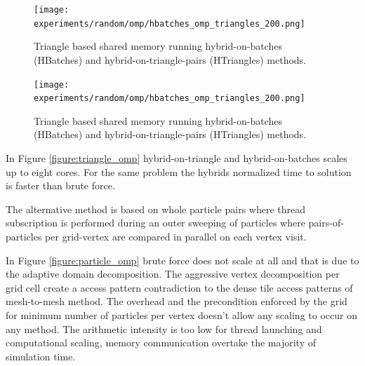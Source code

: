 \begin{figure}[htb]
  \begin{center}
    \texttt{[image: experiments/random/omp/hbatches\_omp\_triangles\_200.png]}
  \end{center}
  \caption{Triangle based shared memory running hybrid-on-batches (HBatches) and hybrid-on-triangle-pairs (HTriangles) methods.}
  \label{figure:hbatches_triangle_omp}
\end{figure}

\begin{figure}[htb]
  \begin{center}
    \texttt{[image: experiments/random/omp/hbatches\_omp\_triangles\_200.png]}
  \end{center}
  \caption{Triangle based shared memory running hybrid-on-batches (HBatches) and hybrid-on-triangle-pairs (HTriangles) methods.}
  \label{figure:htriangles_triangle_omp}
\end{figure}


In Figure \ref{figure:triangle_omp} hybrid-on-triangle and hybrid-on-batches scales up to eight cores. For the same problem the hybrids normalized time to solution is faster than brute force. 





The alternative method is based on whole particle pairs where thread subscription is performed during an outer sweeping of particles where pairs-of-particles per grid-vertex are compared in parallel on each vertex visit. 

In Figure \ref{figure:particle_omp} brute force does not scale at all and that is due to the adaptive domain decomposition. The aggressive vertex decomposition per grid cell create a access pattern contradiction to the dense tile access patterns of mesh-to-mesh method. The overhead and the precondition enforced by the grid for minimum number of particles per vertex doesn't allow any scaling to occur on any method. The arithmetic intensity is too low for thread launching and computational scaling, memory communication overtake the majority of simulation time. 

